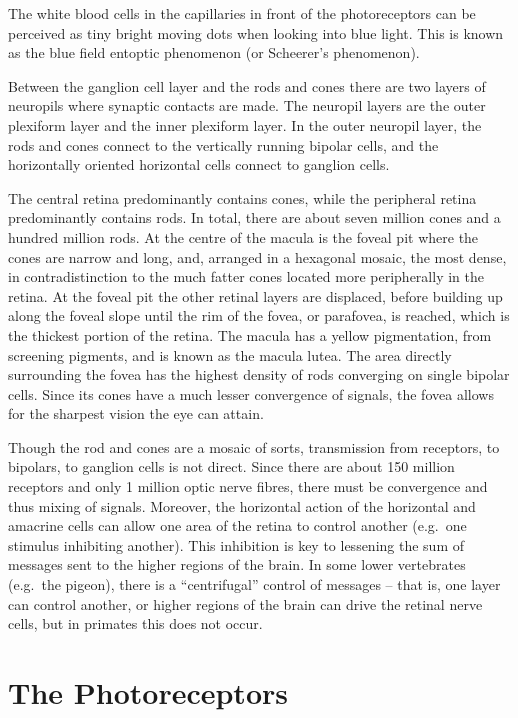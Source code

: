 The white blood cells in the capillaries in front of the photoreceptors can be perceived as tiny bright moving dots when looking into blue light. This is known as the blue field entoptic phenomenon (or Scheerer's phenomenon).

Between the ganglion cell layer and the rods and cones there are two layers of neuropils where synaptic contacts are made. The neuropil layers are the outer plexiform layer and the inner plexiform layer. In the outer neuropil layer, the rods and cones connect to the vertically running bipolar cells, and the horizontally oriented horizontal cells connect to ganglion cells.

The central retina predominantly contains cones, while the peripheral retina predominantly contains rods. In total, there are about seven million cones and a hundred million rods. At the centre of the macula is the foveal pit where the cones are narrow and long, and, arranged in a hexagonal mosaic, the most dense, in contradistinction to the much fatter cones located more peripherally in the retina. At the foveal pit the other retinal layers are displaced, before building up along the foveal slope until the rim of the fovea, or parafovea, is reached, which is the thickest portion of the retina. The macula has a yellow pigmentation, from screening pigments, and is known as the macula lutea. The area directly surrounding the fovea has the highest density of rods converging on single bipolar cells. Since its cones have a much lesser convergence of signals, the fovea allows for the sharpest vision the eye can attain.

Though the rod and cones are a mosaic of sorts, transmission from receptors, to bipolars, to ganglion cells is not direct. Since there are about 150 million receptors and only 1 million optic nerve fibres, there must be convergence and thus mixing of signals. Moreover, the horizontal action of the horizontal and amacrine cells can allow one area of the retina to control another (e.g.~one stimulus inhibiting another). This inhibition is key to lessening the sum of messages sent to the higher regions of the brain. In some lower vertebrates (e.g.~the pigeon), there is a ``centrifugal'' control of messages -- that is, one layer can control another, or higher regions of the brain can drive the retinal nerve cells, but in primates this does not occur.

\hypertarget{the-photoreceptors}{%
\section{The Photoreceptors}\label{the-photoreceptors}}

